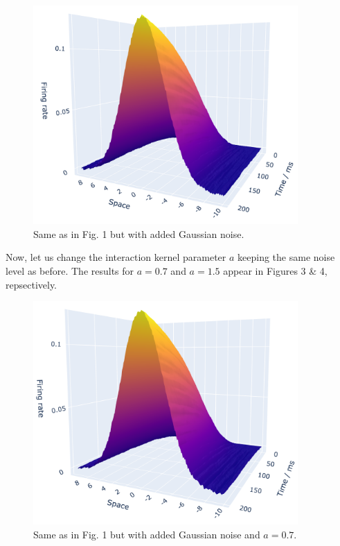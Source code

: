 \documentclass[12pt]{article}
\begin{document}
\begin{enumerate}
\begin{figure}[H]
    \centering
    \includegraphics[width=0.9\textwidth]{./figure2.png}
    \caption{Same as in Fig. 1 but with added Gaussian noise.}
\end{figure}
Now, let us change the interaction kernel parameter $a$ keeping the same noise level as before. The results for $a=0.7$
and $a=1.5$ appear in Figures 3 \& 4, repsectively.
\begin{figure}[H]
    \centering
    \includegraphics[width=0.9\textwidth]{./figure3.png}
    \caption{Same as in Fig. 1 but with added Gaussian noise and $a=0.7$.}
\end{figure}
\begin{figure}[H]
    \centering

\end{figure}
\end{enumerate}
\end{document}
